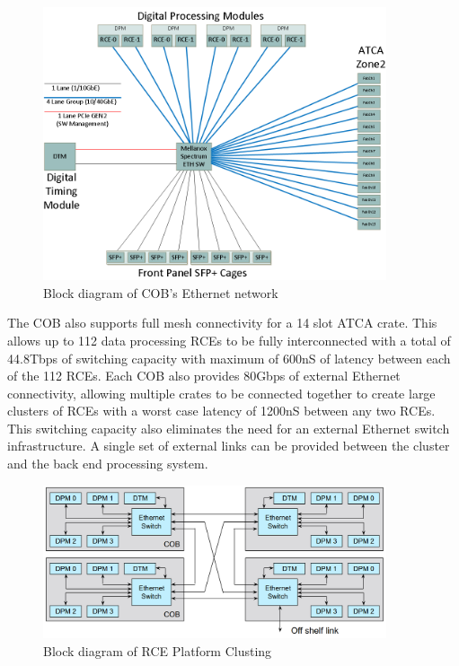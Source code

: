 \begin{figure}[tb]
\centering
\includegraphics[width=0.9\textwidth]{images/COB_ETH-diagram.png}
\caption{\label{fig:COB_ETH_diagram}Block diagram of COB's Ethernet network}
\end{figure}

The COB also supports full mesh connectivity for a 14 slot ATCA crate. This allows up to 112 data processing RCEs to be fully interconnected with a total of 44.8Tbps of switching capacity with maximum of 600nS of latency between each of the 112 RCEs. Each COB also provides 80Gbps of external Ethernet connectivity, allowing multiple crates to be connected together to create large clusters of RCEs with a worst case latency of 1200nS between any two RCEs. This switching capacity also eliminates the need for an external Ethernet switch infrastructure. A single set of external links can be provided between the cluster and the back end processing system.

\begin{figure}[tb]
\centering
\includegraphics[width=0.9\textwidth]{images/RcePlatformClustering.png}
\caption{\label{fig:RcePlatformClustering}Block diagram of RCE Platform Clusting}
\end{figure}

